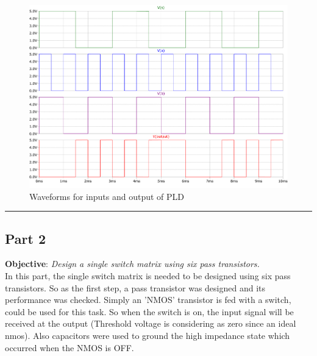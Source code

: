 \documentclass[a4paper,11pt]{article}%
\begin{document}
\begin{figure}[H]
	\centering
	\includegraphics[scale=0.5]{figures/2part1/wave.pdf}
	\caption{Waveforms for inputs and output of PLD }
\end{figure}

\hrule
\subsection{Part 2}
\textbf{Objective}: \textit{Design a single switch matrix using six pass transistors.}\\

In this part, the single switch matrix is needed to be designed using six pass transistors. So as the first step, a pass transistor was designed and its performance was checked. Simply an 'NMOS' transistor is fed with a switch, could be used for this task. So when the switch is on, the input signal will be received at the output (Threshold voltage is considering as zero since an ideal nmos). Also capacitors were used to ground the high impedance state which occurred when the NMOS is OFF.
\end{document}
